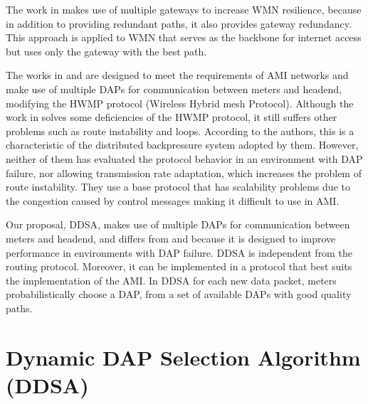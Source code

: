 \documentclass[conference]{IEEEtran}
\begin{document}
The work in \cite{Silva2010} makes use of multiple gateways to increase WMN resilience, because in addition to providing redundant paths, it also provides gateway redundancy. This approach is applied to WMN that serves as the backbone for internet access but uses only the gateway with the best path.


The works in \cite{6412861} and \cite{Gharavi2011} are designed to meet the requirements of AMI networks and make use of multiple DAPs for communication between meters and headend, modifying the HWMP protocol (Wireless Hybrid mesh Protocol). Although the work in \cite{Gharavi2011} solves some deficiencies of the HWMP protocol, it still suffers other problems such as route instability and loops. According to the authors, this is a characteristic of the distributed backpressure system adopted by them. However, neither of them has evaluated the protocol behavior in an environment with DAP failure, nor allowing transmission rate adaptation, which increases the problem of route instability. They use a base protocol that has scalability problems due to the congestion caused by control messages \cite{5473885} making it difficult to use in AMI.


Our proposal, DDSA, makes use of multiple DAPs for communication between meters and headend, and differs from \cite{6412861} and \cite{Gharavi2011} because it is designed to improve performance in environments with DAP failure. DDSA is independent from the routing protocol. Moreover, it can be implemented in a protocol that best suits the implementation of the AMI.
In DDSA for each new data packet, meters probabilistically choose a DAP, from a set of available DAPs with good quality paths. 

\section{Dynamic DAP Selection Algorithm (DDSA)}
\end{document}
